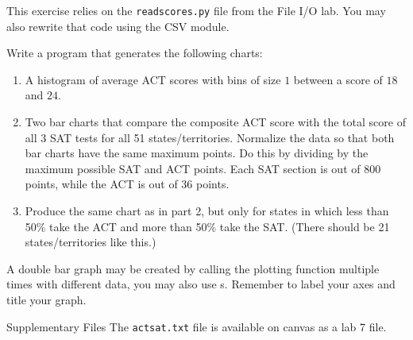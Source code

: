 \documentclass[11pt]{cselabheader}
\begin{document}
\begin{ex}[plotscores.py]
  This exercise relies on the \texttt{readscores.py} file from the File I/O
  lab. You may also rewrite that code using the CSV module.

  Write a program that generates the following charts:
  \begin{enumerate}
    \item A histogram of average ACT scores with bins of size $1$ between a
      score of $18$ and $24$.
    \item Two bar charts that compare the composite ACT score with the
      total score of all 3 SAT tests for all 51 states/territories.
      Normalize the data so that both bar charts have the same maximum points.
      Do this by dividing by the maximum possible SAT and ACT points.
      Each SAT section is out of 800 points, while the ACT is out of 36 points.
    \item Produce the same chart as in part 2, but only for states in which
      less than 50\% take the ACT and more than 50\% take the SAT. (There
      should be 21 states/territories like this.)
  \end{enumerate}

  A double bar graph may be created by calling the 
  plotting function multiple times with different data, you may also use
  s. Remember to label your axes and title your graph.
\end{ex}

\begin{infobox}{Supplementary Files}
The \texttt{actsat.txt} file is available on canvas as a lab 7 file.
\end{infobox}
\end{document}
